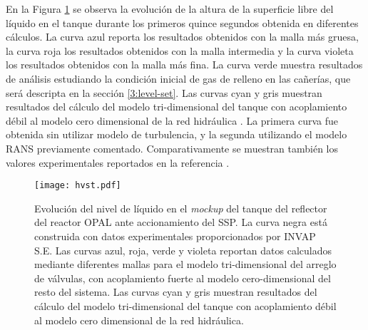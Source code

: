 En la Figura \ref{hvst} se observa la evolución de la altura de la superficie libre del líquido en el tanque durante los primeros quince segundos obtenida en diferentes cálculos.
La curva azul reporta los resultados obtenidos con la malla más gruesa, la curva roja los resultados obtenidos con la malla intermedia y la curva violeta los resultados obtenidos con la malla más fina.
La curva verde muestra resultados de análisis estudiando la condición inicial de gas de relleno en las cañerías, que será descripta en la sección \ref{3:level-set}.
Las curvas cyan y gris muestran resultados del cálculo del modelo tri-dimensional del tanque con acoplamiento débil al modelo cero dimensional de la red hidráulica \cite{ra10-paper}.
La primera curva fue obtenida sin utilizar modelo de turbulencia, y la segunda utilizando el modelo RANS previamente comentado.
Comparativamente se muestran también los valores experimentales reportados en la referencia \cite{invap-mockup}.

\begin{figure}[ht]
\centering
\texttt{[image: hvst.pdf]}
\caption[Evolución del nivel de líquido en el \textit{mockup} del tanque del reflector del reactor OPAL ante accionamiento del SSP]
{Evolución del nivel de líquido en el \textit{mockup} del tanque del reflector del reactor OPAL ante accionamiento del SSP.
La curva negra está construida con datos experimentales proporcionados por INVAP S.E.
Las curvas azul, roja, verde y violeta reportan datos calculados mediante diferentes mallas para el modelo tri-dimensional del arreglo de válvulas, 
con acoplamiento fuerte al modelo cero-dimensional del resto del sistema.
Las curvas cyan y gris muestran resultados del cálculo del modelo tri-dimensional del tanque con acoplamiento débil al modelo cero dimensional de la red hidráulica.}
\label{hvst} 
\end{figure}

